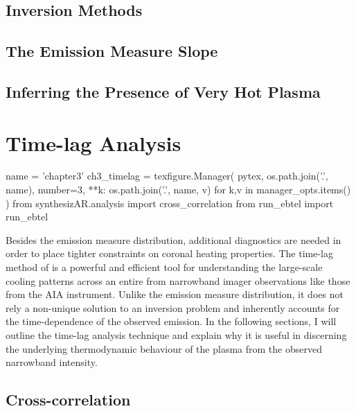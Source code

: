 \subsection{Inversion Methods}

\subsection{The Emission Measure Slope}

\subsection{Inferring the Presence of Very Hot Plasma}

\section{Time-lag Analysis}\label{sec:timelag}

\begin{pycode}
name = 'chapter3'
ch3_timelag = texfigure.Manager(
    pytex,
    os.path.join('.', name),
    number=3,
    **{k: os.path.join('.', name, v) for k,v in manager_opts.items()}
)
from synthesizAR.analysis import cross_correlation
from run_ebtel import run_ebtel
\end{pycode}


Besides the emission measure distribution, additional diagnostics are needed in order to place tighter constraints on coronal heating properties. The time-lag method of \citet{viall_evidence_2012} is a powerful and efficient tool for understanding the large-scale cooling patterns across an entire \AR{} from narrowband imager observations like those from the AIA instrument. Unlike the emission measure distribution, it does not rely a non-unique solution to an inversion problem and inherently accounts for the time-dependence of the observed emission. In the following sections, I will outline the time-lag analysis technique and explain why it is useful in discerning the underlying thermodynamic behaviour of the plasma from the observed narrowband intensity. 

\subsection{Cross-correlation}\label{subsec:cross_correlation}

